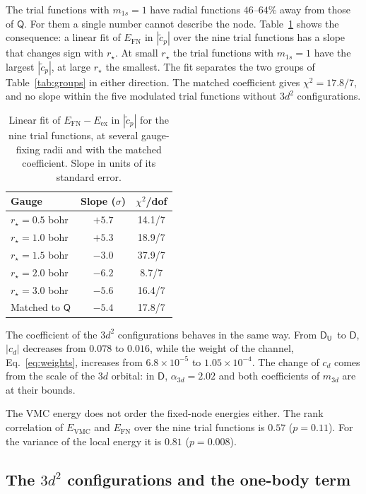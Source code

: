 \documentclass[aps,prb,reprint,amsmath,amssymb,superscriptaddress,nofootinbib]{revtex4-2}
\newcommand{\mQ}{\ensuremath{\textsf{Q}}}
\newcommand{\mD}{\ensuremath{\textsf{D}}}
\newcommand{\mDU}{\ensuremath{\textsf{D}_{\textsf{U}}}}
\begin{document}
The trial functions with $m_{1s} = 1$ have radial functions $46$--$64\%$ away
from those of \mQ. For them a single number cannot describe the node.
Table~\ref{tab:rstar} shows the consequence: a linear fit of
$E_{\mathrm{FN}}$ in $|\tilde c_p|$ over the nine trial functions has a slope
that changes sign with $r_\star$. At small $r_\star$ the trial functions with
$m_{1s} = 1$ have the largest $|\tilde c_p|$, at large $r_\star$ the smallest.
The fit separates the two groups of Table~\ref{tab:groups} in either
direction. The matched coefficient gives $\chi^2 = 17.8/7$, and no slope
within the five modulated trial functions without $3d^2$ configurations.

\begin{table}[t]
\caption{Linear fit of $E_{\mathrm{FN}} - E_{\mathrm{ex}}$ in
$|\tilde c_p|$ for the nine trial functions, at several gauge-fixing radii and
with the matched coefficient. Slope in units of its standard error.}
\label{tab:rstar}
\centering
\small
\begin{tabular}{lcc}
\hline\hline
Gauge & Slope ($\sigma$) & $\chi^2$/dof \\
\hline
$r_\star = 0.5$ bohr & $+5.7$ & 14.1/7 \\
$r_\star = 1.0$ bohr & $+5.3$ & 18.9/7 \\
$r_\star = 1.5$ bohr & $-3.0$ & 37.9/7 \\
$r_\star = 2.0$ bohr & $-6.2$ & 8.7/7  \\
$r_\star = 3.0$ bohr & $-5.6$ & 16.4/7 \\
Matched to \mQ       & $-5.4$ & 17.8/7 \\
\hline\hline
\end{tabular}
\end{table}

The coefficient of the $3d^2$ configurations behaves in the same way. From
\mDU\ to \mD, $|c_d|$ decreases from $0.078$ to $0.016$, while the weight of
the channel, Eq.~\eqref{eq:weights}, increases from $6.8\times10^{-5}$ to
$1.05\times10^{-4}$. The change of $c_d$ comes from the scale of the $3d$
orbital: in \mD, $\alpha_{3d} = 2.02$ and both coefficients of $m_{3d}$ are at
their bounds.

The VMC energy does not order the fixed-node energies either. The rank
correlation of $E_{\mathrm{VMC}}$ and $E_{\mathrm{FN}}$ over the nine trial
functions is $0.57$ ($p = 0.11$). For the variance of the local energy it is
$0.81$ ($p = 0.008$).

\subsection{The $3d^2$ configurations and the one-body term}
\label{ssec:dchannel}
\end{document}
